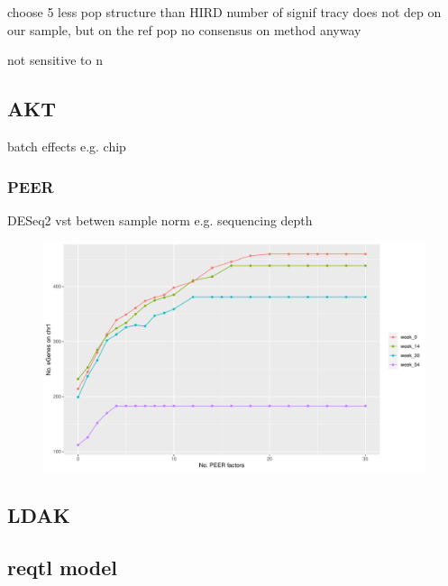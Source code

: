 \begin{outline}
choose 5
    less pop structure than HIRD
    number of signif tracy does not dep on our sample, but on the ref pop 
    no consensus on method anyway

    not sensitive to n


\subsection{AKT}

batch effects
    e.g. chip

\subsubsection{PEER}

DESeq2 vst
betwen sample norm e.g. sequencing depth 

\begin{figure}
    \centering
    \includegraphics[width=1.0\textwidth,page=1]{mainmatter/figures/chapter_04/count_eGenes.signif_eGenes_vs_PEER_n.dataset_multiPANTS.chr_1.pdf}
    \caption{}
    \label{fig:multipants_reqtl_PEER_k_choice}
\end{figure}

\subsection{LDAK}

\subsection{reqtl model}


\end{outline}
